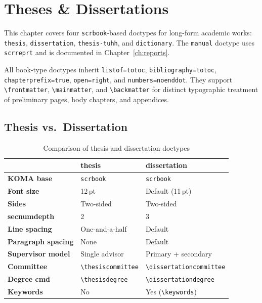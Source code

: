 \chapter{Theses \& Dissertations}
\label{ch:theses}

This chapter covers four \texttt{scrbook}-based doctypes for long-form
academic works: \texttt{thesis}, \texttt{dissertation},
\texttt{thesis-tuhh}, and \texttt{dictionary}.  The \texttt{manual} doctype
uses \texttt{scrreprt} and is documented in
Chapter~\ref{ch:reports}.

All book-type doctypes inherit \texttt{listof=totoc},
\texttt{bibliography=totoc}, \texttt{chapterprefix=true},
\texttt{open=right}, and \texttt{numbers=noenddot}.  They support
\texttt{\textbackslash frontmatter}, \texttt{\textbackslash mainmatter},
and \texttt{\textbackslash backmatter} for distinct typographic treatment
of preliminary pages, body chapters, and appendices.

\section{Thesis vs.\ Dissertation}

\begin{table}[htbp]
    \centering
    \caption{Comparison of thesis and dissertation doctypes}
    \label{tab:thesis-vs-dissertation}
    \begin{tabular}{@{} l p{5.5cm} p{5.5cm} @{}}
        \toprule
        & \textbf{thesis} & \textbf{dissertation} \\
        \midrule
        \textbf{KOMA base}   & \texttt{scrbook} & \texttt{scrbook} \\[3pt]
        \textbf{Font size}   & 12\,pt & Default (11\,pt) \\[3pt]
        \textbf{Sides}       & Two-sided & Two-sided \\[3pt]
        \textbf{secnumdepth} & 2 & 3 \\[3pt]
        \textbf{Line spacing} & One-and-a-half & Default \\[3pt]
        \textbf{Paragraph spacing} & None & Default \\[3pt]
        \textbf{Supervisor model}  & Single advisor & Primary + secondary \\[3pt]
        \textbf{Committee}   & \texttt{\textbackslash thesiscommittee} &
                               \texttt{\textbackslash dissertationcommittee} \\[3pt]
        \textbf{Degree cmd}  & \texttt{\textbackslash thesisdegree} &
                               \texttt{\textbackslash dissertationdegree} \\[3pt]
        \textbf{Keywords}    & No & Yes (\texttt{\textbackslash keywords}) \\
        \bottomrule
    \end{tabular}
\end{table}

